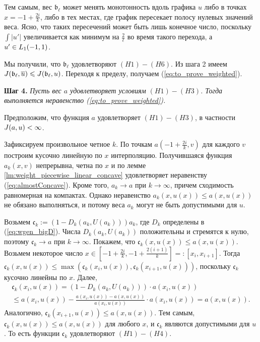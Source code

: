 Тем самым, вес $\mathfrak  b_{\ell}$ может менять монотонность вдоль графика $u$
либо в точках $x = -1 + \frac{2 i}{k}$, либо в тех местах, где график пересекает полосу нулевых значений веса.
Ясно, что таких пересечений может быть лишь конечное число, поскольку
$\int |u'|$ увеличивается как минимум на $\frac{2}{\ell}$ во время такого перехода, а $u' \in L_1(-1, 1)$.

Мы получили, что $\mathfrak b_{\ell}$ удовлетворяют $(H1)-(H6)$.
Из шага 2 имеем $\IWg(\mathfrak b_{\ell}, \mon{u}) \le \IWg(\mathfrak b_{\ell}, u)$.
Переходя к пределу, получаем (\ref{eq:to_prove_weighted}).

\bigskip
\textbf{Шаг 4.}
\textit{Пусть вес $a$ удовлетворяет условиям $(H1)-(H3)$.
Тогда выполняется неравенство (\ref{eq:to_prove_weighted}).}

Предположим, что функция  $a$ удовлетворяет $(H1)-(H3)$, в частности $J(a, u) < \infty$.

Зафиксируем произвольное четное $k$.
По точкам $a(-1 + \frac{2i}{k}, v)$ для каждого $v$ построим кусочно линейную по $x$ интерполяцию.
Получившаяся функция $a_k(x, v)$ непрерывна, четна по $x$
и по лемме \ref{lm:weight_piecewise_linear_concave} удовлетворяет неравенству (\ref{eq:almostConcave}).
Кроме того, $a_k \to a$ при $k \to \infty$, причем сходимость равномерная на компактах.
Однако неравенство $a_k(x, u(x)) \le a(x, u(x))$ не обязано выполняться,
и потому веса $a_k$ могут не быть допустимыми для $u$.

Возьмем $\mathfrak c_k := (1 - D_k(a_k, U(a_k))) a_k$, где $D_k$ определены в (\ref{eq:wgen_bigD}).
Числа $D_k(a_k, U(a_k))$ положительны и стремятся к нулю, поэтому $\mathfrak c_k \to a$ при $k \to \infty$.
Покажем, что $\mathfrak c_k(x, u(x)) \le a(x, u(x))$.
Возьмем некоторое число
$x \in [-1 + \frac{2i}{k}, -1 + \frac{2(i + 1)}{k}] =: [x_i, x_{i + 1}]$.
Тогда $\mathfrak c_k(x, u(x)) \le \max( \mathfrak c_k(x_i, u(x)), \mathfrak c_k(x_{i + 1}, u(x)) )$,
поскольку $\mathfrak c_k$ кусочно линейны по $x$.
Далее,
\begin{multline*}
\mathfrak c_k(x_i, u(x)) = ( 1 - D_k(a_k, U(a_k))) \cdot a(x_i, u(x)) \\
\le a(x_i, u(x)) - \frac{a(x_i, u(x)) - a(x, u(x))}{a(x_i, u(x))} \cdot a(x_i, u(x)) = a(x, u(x)).
\end{multline*}
Аналогично, $\mathfrak c_k(x_{i + 1}, u(x)) \le a(x, u(x))$.
Тем самым, $\mathfrak c_k(x, u(x)) \le a(x, u(x))$ для любого $x$, и $\mathfrak c_k$ являются допустимыми для $u$.
То есть функции $\mathfrak c_k$ удовлетворяют $(H1)-(H4)$.

